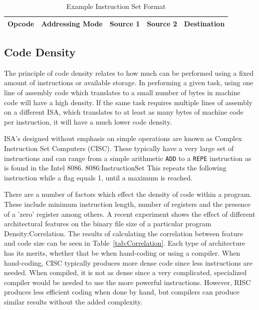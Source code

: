 \documentclass[12pt,a4paper]{article}
\begin{document}
\begin{table}[h]
	\centering
	\begin{tabular}{|c|c|c|c|c|}
	\hline Opcode & Addressing Mode & Source 1 & Source 2 & Destination \\ \hline
	\end{tabular}
	\caption{\label{tab:ExFormat}Example Instruction Set Format}
\end{table}

\subsection{Code Density}
The principle of code density relates to how much can be performed using a fixed amount of instructions or available storage. In performing a given task, using one line of assembly code which translates to a small number of bytes in machine code will have a high density. If the same task requires multiple lines of assembly on a different ISA, which translates to at least as many bytes of machine code per instruction, it will have a much lower code density. 

ISA's designed without emphasis on simple operations are known as Complex Instruction Set Computers (CISC). These typically have a very large set of instructions and can range from a simple arithmetic \texttt{ADD} to a \texttt{REPE} instruction as is found in the Intel 8086. \cite{ref}{8086:InstructionSet} This repeats the following instruction while a flag equals 1, until a maximum is reached. 

There are a number of factors which effect the density of code within a program. These include minimum instruction length, number of registers and the presence of a 'zero' register among others. A recent experiment shows the effect of different architectural features on the binary file size of a particular program \cite{ref}{Density:Correlation}. The results of calculating the correlation between feature and code size can be seen in Table~\ref{tab:Correlation}. Each type of architecture has its merits, whether that be when hand-coding or using a compiler. When hand-coding, CISC typically produces more dense code since less instructions are needed. When compiled, it is not as dense since a very complicated, specialized compiler would be needed to use the more powerful instructions. However, RISC produces less efficient coding when done by hand, but compilers can produce similar results without the added complexity.
\end{document}
